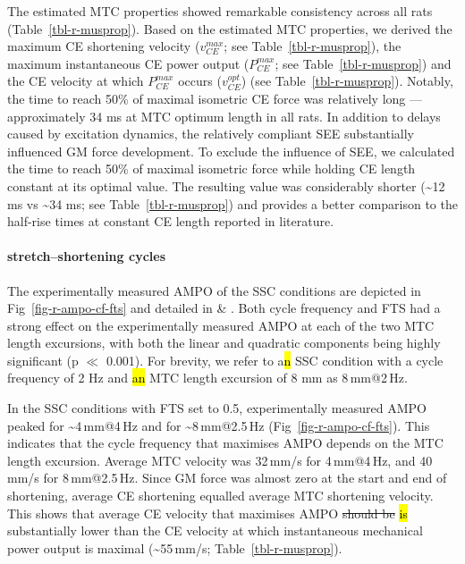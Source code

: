 \documentclass[
  10pt,
  letterpaper,
]{article}
\begin{document}
The estimated MTC properties showed remarkable consistency across all
rats (Table~\ref{tbl-r-musprop}). Based on the estimated MTC properties,
we derived the maximum CE shortening velocity (\(v_{CE}^{max}\); see
Table~\ref{tbl-r-musprop}), the maximum instantaneous CE power output
(\(P_{CE}^{max}\); see Table~\ref{tbl-r-musprop}) and the CE velocity at
which \(P_{CE}^{max}\) occurs (\(v_{CE}^{opt}\)) (see
Table~\ref{tbl-r-musprop}). Notably, the time to reach 50\% of maximal
isometric CE force was relatively long --- approximately 34 ms at MTC
optimum length in all rats. In addition to delays caused by excitation
dynamics, the relatively compliant SEE substantially influenced GM force
development. To exclude the influence of SEE, we calculated the time to
reach 50\% of maximal isometric force while holding CE length constant
at its optimal value. The resulting value was considerably shorter
(\textasciitilde12 ms vs \textasciitilde34 ms; see
Table~\ref{tbl-r-musprop}) and provides a better comparison to the
half-rise times at constant CE length reported in literature.

\begin{table}[H]

\caption{\label{tbl-r-musprop}Estimated MTC properties \hl{of rat
\emph{m. gastorcnemius medialis}} as well as metrics derived from these
properties.}

\centering{



}

\end{table}%

\paragraph{stretch--shortening cycles}\label{stretchshortening-cycles}

The experimentally measured AMPO of the SSC conditions are depicted in
Fig~\ref{fig-r-ampo-cf-fts} and detailed in { \&
}. Both cycle frequency and FTS had a strong effect on
the experimentally measured AMPO at each of the two MTC length
excursions, with both the linear and quadratic components being highly
significant (p \(\ll\) 0.001). For brevity, we refer to a\hl{n} SSC
condition with a cycle frequency of 2 Hz and \hl{an} MTC length
excursion of 8 mm as 8\,mm@2\,Hz.

In the SSC conditions with FTS set to 0.5, experimentally measured AMPO
peaked for \textasciitilde4\,mm@4\,Hz and for
\textasciitilde8\,mm@2.5\,Hz (Fig~\ref{fig-r-ampo-cf-fts}). This
indicates that the cycle frequency that maximises AMPO depends on the
MTC length excursion. Average MTC velocity was 32\,mm/s for 4\,mm@4\,Hz,
and 40\,mm/s for 8\,mm@2.5\,Hz. Since GM force was almost zero at the
start and end of shortening, average CE shortening equalled average MTC
shortening velocity. This shows that average CE velocity that maximises
AMPO \st{should be} \hl{is} substantially lower than the CE velocity at
which instantaneous mechanical power output is maximal
(\textasciitilde55\,mm/s; Table~\ref{tbl-r-musprop}).
\end{document}
